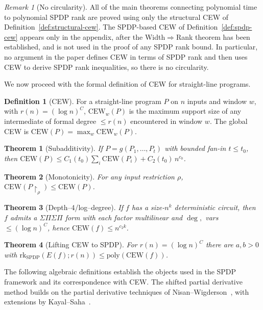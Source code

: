 \documentclass[12pt]{article}
\newcommand{\CEW}{\mathrm{CEW}}
\newtheorem{theorem}{Theorem}
\theoremstyle{definition}
\newtheorem{definition}{Definition}
\theoremstyle{definition}
\theoremstyle{remark}
\newtheorem{remark}{Remark}
\theoremstyle{remark}
\begin{document}
\begin{remark}[No circularity]
\label{rem:cew-non-circular}
All of the main theorems connecting polynomial time to polynomial SPDP rank
are proved using only the structural CEW of Definition~\ref{def:structural-cew}. The
SPDP-based CEW of Definition~\ref{def:spdp-cew} appears only in the appendix,
after the Width$\Rightarrow$Rank theorem has been established, and is not used
in the proof of any SPDP rank bound. In particular, no argument in the paper
defines CEW in terms of SPDP rank and then uses CEW to derive SPDP rank
inequalities, so there is no circularity.
\end{remark}

We now proceed with the formal definition of CEW for straight-line programs.

\begin{definition}[CEW]
For a straight-line program $P$ on $n$ inputs and window $w$, with $r(n)=(\log n)^C$,
$\CEW_w(P)$ is the maximum support size of any intermediate of formal degree $\le r(n)$
encountered in window $w$. The global CEW is $\CEW(P)=\max_w \CEW_w(P)$.
\end{definition}

\begin{theorem}[Subadditivity]\label{thm:cew-subadd}
If $P=g(P_1,\dots,P_t)$ with bounded fan-in $t\le t_0$, then
$\CEW(P)\le C_1(t_0)\sum_i \CEW(P_i)+C_2(t_0)\,n^{c_0}$.
\end{theorem}

\begin{theorem}[Monotonicity]\label{thm:cew-mono}
For any input restriction $\rho$, $\CEW(P\!\upharpoonright_\rho)\le \CEW(P)$.
\end{theorem}

\begin{theorem}[Depth--4/log--degree]\label{thm:cew-depth4}
If $f$ has a size-$n^k$ deterministic circuit, then $f$ admits a $\Sigma\Pi\Sigma\Pi$ form
with each factor multilinear and $\deg,$ vars $\le (\log n)^C$, hence $\CEW(f)\le n^{c_2k}$.
\end{theorem}

\begin{theorem}[Lifting CEW to SPDP]\label{thm:cew-to-spdp}
For $r(n)=(\log n)^C$ there are $a,b>0$ with
$\mathrm{rk}_{\mathrm{SPDP}}(E(f);r(n)) \le \mathrm{poly}(\CEW(f))$.
\end{theorem}

The following algebraic definitions establish the objects used in the SPDP framework and its correspondence with CEW. The shifted partial derivative method builds on the partial derivative techniques of Nisan--Wigderson~\cite{nisanwigderson1997}, with extensions by Kayal--Saha~\cite{kayal2015}.
\end{document}
